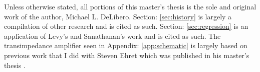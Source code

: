 Unless otherwise stated, all portions of this master's thesis is the sole and original work of the author, Michael L. DeLibero.
Section: \ref{sec:history}  is largely a compilation of other research and is cited as such. 
Section: \ref{sec:regression}  is an application of Levy's\cite{levy} and Sanathanan's\cite{levy_iter} work and is cited as such. 
The transimpedance amplifier seen in Appendix: \ref{app:schematic}  is largely based on previous work that I did with Steven Ehret which was published in his master's thesis \cite{steve_thesis}.

